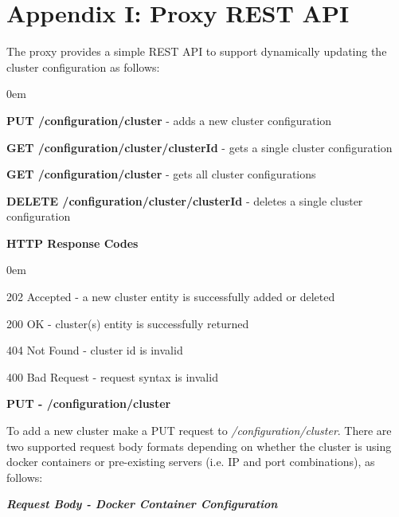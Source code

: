 \documentclass[a4paper,11pt,twoside]{report}
\begin{document}
\section*{Appendix I: Proxy REST API}\label{Appendix I}
The proxy provides a simple REST API to support dynamically updating the cluster configuration as follows:

\begin{list}{-}{}
  \itemsep0em
  \item \textbf{PUT /configuration/cluster} - adds a new cluster configuration  
 \item\textbf{GET /configuration/cluster/{clusterId}} - gets a single cluster configuration
 \item\textbf{GET /configuration/cluster} - gets all cluster configurations
 \item\textbf{DELETE /configuration/cluster/{clusterId}} - deletes a single cluster configuration
\end{list}

\noindent
\textbf{HTTP Response Codes}
\begin{list}{-}{}
  \itemsep0em
\item 202 Accepted - a new cluster entity is successfully added or deleted 
\item 200 OK - cluster(s) entity is successfully returned   
\item 404 Not Found - cluster id is invalid
\item 400 Bad Request - request syntax is  invalid
\end{list}

\noindent
\textbf{PUT - /configuration/cluster}

\noindent
To add a new cluster make a PUT request to \textit{/configuration/cluster}.  There are two supported request body formats depending on whether the cluster is using docker containers or pre-existing servers (i.e. IP and port combinations), as follows:\bigskip

\noindent
\textit{\textbf{Request Body - Docker Container Configuration}}
\end{document}
